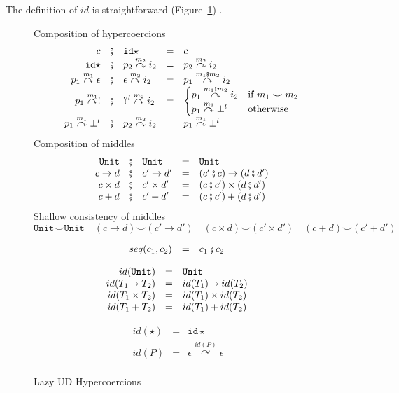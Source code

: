 \documentclass[acmsmall,review,anonymous]{acmart}\settopmatter{printfolios=true,printccs=false,printacmref=false}
\newcommand{\funrule}[3]{#1 &=& #2 & #3\\}
\newcommand{\plus}[0]{+}
\newcommand{\POOunit}[0]{\mathtt{Unit}}
\newcommand{\POOfun}[2]{#1 \shortrightarrow #2}
\newcommand{\POOprod}[2]{#1 \times #2}
\newcommand{\POOsum}[2]{#1 \plus #2}
\newcommand{\hyperCoercionI}[0]{\mathtt{id\star}}
\newcommand{\hyperCoercionC}[3]{#1 \overset{#2}{\curvearrowright} #3}
\begin{document}
The definition of $id$ is straightforward (Figure~\ref{fig:HC-UD}) .

\begin{figure}
  Composition of hypercoercions 
  \[
  \begin{array}{rclclr}
  c &\fatsemi& \hyperCoercionI{} &=& c\\
  \hyperCoercionI{} &\fatsemi& \hyperCoercionC{p_2}{m_2}{i_2} &=&
       \hyperCoercionC{p_2}{m_2}{i_2} \\
  \hyperCoercionC{p_1}{m_1}{\epsilon} &\fatsemi& \hyperCoercionC{\epsilon}{m_2}{i_2} &=&
       \hyperCoercionC{p_1}{m_1 \fatsemi m_2}{i_2} \\
  \hyperCoercionC{p_1}{m_1}{!} &\fatsemi& \hyperCoercionC{?^l}{m_2}{i_2} &=&
  \begin{cases}
    \hyperCoercionC{p_1}{m_1 \fatsemi m_2}{i_2} & \text{if } m_1 \smile m_2 \\
    \hyperCoercionC{p_1}{m_1}{\bot^l} & \text{otherwise}
  \end{cases} \\
  \hyperCoercionC{p_1}{m_1}{\bot^l} &\fatsemi& \hyperCoercionC{p_2}{m_2}{i_2} &=&
     \hyperCoercionC{p_1}{m_1}{\bot^l}
  \end{array}
  \]
  Composition of middles 
  \[
  \begin{array}{rclclr}  
  \POOunit &\fatsemi& \POOunit &=& \POOunit \\
  c \to d &\fatsemi& c' \to d' &=& (c' \fatsemi c) \to (d \fatsemi d') \\
  c \times d &\fatsemi& c' \times d' &=& (c \fatsemi c') \times (d \fatsemi d') \\
  c + d &\fatsemi& c' + d' &=& (c \fatsemi c') + (d \fatsemi d')
  \end{array}
  \]
  Shallow consistency of middles 
  \[
  \POOunit \smile \POOunit \quad
  (c \to d) \smile (c' \to d') \quad
  (c \times d) \smile (c' \times d') \quad
  (c + d) \smile (c' + d')
  \]

  \[
  \begin{array}{rclr}
    \funrule{seq(c_1,c_2)}{
      c_1 \fatsemi c_2
    }{}
  \end{array}
  \]
  
  \[
  \begin{array}{rclr}
    \funrule{id(\POOunit)}{\POOunit}{}
    \funrule{id(\POOfun{T_1}{T_2})}{
    \POOfun{id(T_1)}{id(T_2)}
    }{}
    \funrule{id(\POOprod{T_1}{T_2})}{
    \POOprod{id(T_1)}{id(T_2)}
    }{}
    \funrule{id(\POOsum{T_1}{T_2})}{
    \POOsum{id(T_1)}{id(T_2)}
    }{}
  \end{array}
  \]
  
  \[
  \begin{array}{rclr}
    \funrule{id(\star)}{
    \hyperCoercionI
    }{}
    \funrule{id(P)}{
    \hyperCoercionC{\epsilon}{id(P)}{\epsilon}
    }{}
  \end{array}
  \]
  \caption{Lazy UD Hypercoercions}
  \label{fig:HC-UD}
\end{figure}
\end{document}
